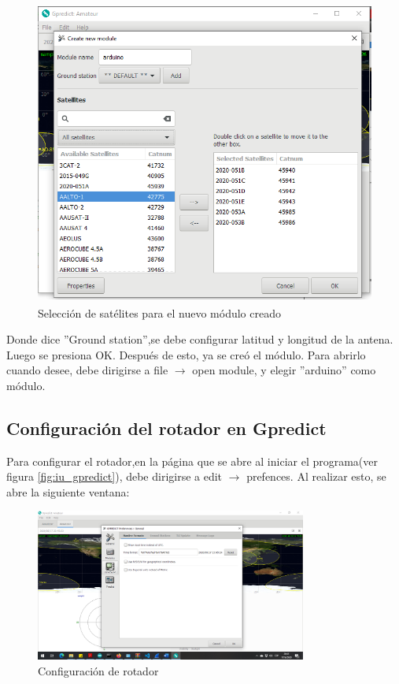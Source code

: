 \begin{figure}[ht]
	\centering
	\includegraphics[height=10cm,width=\textwidth]{select_sat}
	\caption{Selección de satélites para el nuevo módulo creado} 
	\label{fig:sel_sat}	
\end{figure}
Donde dice ''Ground station'',se debe configurar latitud y longitud de la antena. Luego se presiona OK. Después de esto, ya se creó el módulo. Para abrirlo cuando desee, debe dirigirse a file $\rightarrow$ open module, y elegir ''arduino'' como módulo.
\subsection{Configuración del rotador en Gpredict} \label{subs:conf_Gpredict}
Para configurar el rotador,en la página que se abre al iniciar el programa(ver figura	\ref{fig:iu_gpredict}), debe dirigirse a edit $\rightarrow$ prefences. Al realizar esto, se abre la siguiente ventana: 
\begin{figure}[H]
	\includegraphics[height=5cm,width=\textwidth]{select_rot}
	\caption{Configuración de rotador}
\end{figure} 

